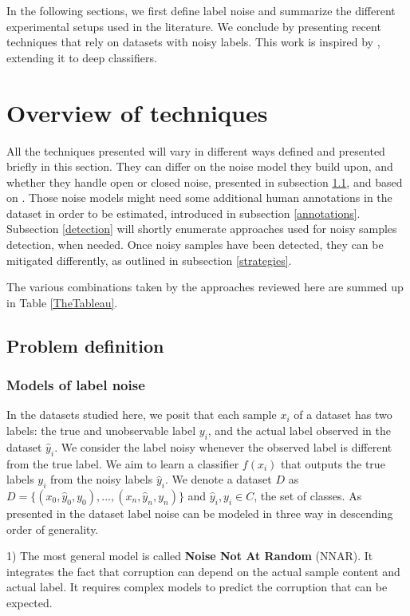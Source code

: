 In the following sections, we first define label noise and summarize the different experimental setups used in the literature. We conclude by presenting recent techniques that rely on datasets with noisy labels. This work is inspired by \citep{NoiseSurvey}, extending it to deep classifiers.

\section{Overview of techniques}
All the techniques presented will vary in different ways defined and presented briefly in this section. They can differ on the noise model they build upon, and whether they handle open or closed noise, presented in subsection \ref{defs}, and based on \citep{NoiseSurvey}. Those noise models might need some additional human annotations in the dataset in order to be estimated, introduced in subsection \ref{annotations}. Subsection \ref{detection} will shortly enumerate approaches used for noisy samples detection, when needed. Once noisy samples have been detected, they can be mitigated differently, as outlined in subsection \ref{strategies}.

The various combinations taken by the approaches reviewed here are summed up in Table \ref{TheTableau}.

\subsection{Problem definition}

\label{defs}
\subsubsection{Models of label noise}

In the datasets studied here, we posit that each sample $x_i$ of a dataset has two labels: the true and unobservable label $y_i$, and the actual label observed in the dataset $\hat{y}_i$. We consider the label noisy whenever the observed label is different from the true label. We aim to learn a classifier $f(x_i)$ that outputs the true labels $y_i$  from the noisy labels $\hat{y}_i$. We denote a dataset $D$ as $D = \{(x_0, \hat{y}_0, y_0), ..., (x_n, \hat{y}_n, y_n)\}$ and $\hat{y}_i, y_i \in C$, the set of classes. As presented in \citep{NoiseSurvey} the dataset label noise can be modeled in three way in descending order of generality.

1) The most general model is called \textbf{Noise Not At Random} (NNAR). It integrates the fact that corruption can depend on the actual sample content and actual label. It requires complex models to predict the corruption that can be expected.

